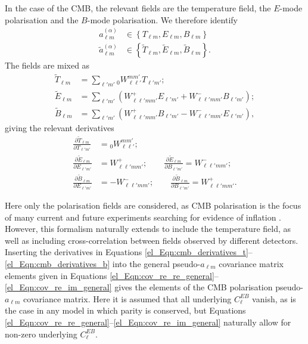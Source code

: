 In the case of the CMB, the relevant fields are the temperature field, the $E$-mode polarisation and the $B$-mode polarisation. We therefore identify
\begin{align}
a_{\ell m}^{\left( \alpha \right)} &\in
\left\{ T_{\ell m}, E_{\ell m}, B_{\ell m} \right\} \\
\widetilde{a}_{\ell m}^{\left( \alpha \right)} &\in
\left\{ \widetilde{T}_{\ell m},
\widetilde{E}_{\ell m},
\widetilde{B}_{\ell m} \right\}.
\end{align}
The fields are mixed as \citep{Lewis2001, Brown2005}
\begin{align}
\widetilde{T}_{\ell m} &= \sum_{\ell' m'} {}_0W_{\ell \ell'}^{m m'} T_{\ell' m'}; \\
\widetilde{E}_{\ell m} &= \sum_{\ell' m'} \left(
W_{\ell \ell' m m'}^+ E_{\ell' m'} + W_{\ell \ell' m m'}^- B_{\ell' m'}
\right); \\
\widetilde{B}_{\ell m} &= \sum_{\ell' m'} \left(
W_{\ell \ell' m m'}^+ B_{\ell' m'} - W_{\ell \ell' m m'}^- E_{\ell' m'}
\right),
\end{align}
giving the relevant derivatives
\begin{align}
\frac{ \partial \widetilde{T}_{\ell m} }{ \partial T_{\ell' m'} }
&= {}_0W_{\ell \ell'}^{m m'};
\label{el_Eqn:cmb_derivatives_t} \\
\frac{ \partial \widetilde{E}_{\ell m} }{ \partial E_{\ell' m'} }
&= W_{\ell \ell' m m'}^+; \quad \quad
\frac{ \partial \widetilde{E}_{\ell m} }{ \partial B_{\ell' m'} }
= W_{\ell \ell' m m'}^-; \\
\frac{ \partial \widetilde{B}_{\ell m} }{ \partial E_{\ell' m'} }
&= - W_{\ell \ell' m m'}^-; \quad \quad
\frac{ \partial \widetilde{B}_{\ell m} }{ \partial B_{\ell' m'} }
= W_{\ell \ell' m m'}^+.
\label{el_Eqn:cmb_derivatives_b}
\end{align}

Here only the polarisation fields are considered, as CMB polarisation is the focus of many current and future experiments searching for evidence of inflation \citep[e.g.][]{Hui2018, so2019, Abazajian2016, Hazumi2019}. However, this formalism naturally extends to include the temperature field, as well as including cross-correlation between fields observed by different detectors. Inserting the derivatives in Equations \eqref{el_Eqn:cmb_derivatives_t}--\eqref{el_Eqn:cmb_derivatives_b} into the general pseudo-$a_{\ell m}$ covariance matrix elements given in Equations \eqref{el_Eqn:cov_re_re_general}--\eqref{el_Eqn:cov_re_im_general} gives the elements of the CMB polarisation pseudo-$a_{\ell m}$ covariance matrix. Here it is assumed that all underlying $C_\ell^{EB}$ vanish, as is the case in any model in which parity is conserved, but Equations \eqref{el_Eqn:cov_re_re_general}--\eqref{el_Eqn:cov_re_im_general} naturally allow for non-zero underlying $C_\ell^{EB}$.

